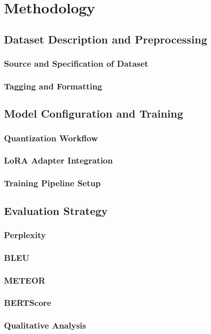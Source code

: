\clearpage

\chapter{Methodology}

\section{Dataset Description and Preprocessing}
\subsection{Source and Specification of Dataset}
\subsection{Tagging and Formatting}

\section{Model Configuration and Training}
\subsection{Quantization Workflow}
\subsection{LoRA Adapter Integration}
\subsection{Training Pipeline Setup}

\section{Evaluation Strategy}
\subsection{Perplexity}
\subsection{BLEU}
\subsection{METEOR}
\subsection{BERTScore}
\subsection{Qualitative Analysis}

\newpage
